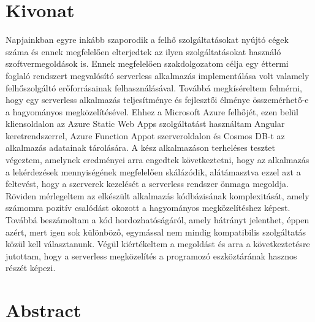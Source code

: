 \chapter*{Kivonat}

Napjainkban egyre inkább szaporodik a felhő szolgáltatásokat nyújtó cégek száma és ennek megfelelően elterjedtek az ilyen szolgáltatásokat használó szoftvermegoldások is. Ennek megfelelően szakdolgozatom célja egy éttermi foglaló rendszert megvalósító serverless alkalmazás implementálása volt valamely felhőszolgáltó erőforrásainak felhasználásával. Továbbá megkíséreltem felmérni, hogy egy serverless alkalmazás teljesítménye és fejlesztői élménye összemérhető-e a hagyományos megközelítésével. Ehhez a Microsoft Azure felhőjét, ezen belül kliensoldalon az Azure Static Web Apps szolgáltatást használtam Angular keretrendszerrel, Azure Function Appot szerveroldalon és Cosmos DB-t az alkalmazás adatainak tárolására. A kész alkalmazáson terheléses tesztet végeztem, amelynek eredményei arra engedtek következtetni, hogy az alkalmazás a lekérdezések mennyiségének megfelelően skálázódik, alátámasztva ezzel azt a feltevést, hogy a szerverek kezelését a serverless rendszer önmaga megoldja. Röviden mérlegeltem az elkészült alkalmazás kódbázisának komplexitását, amely számomra pozitív csalódást okozott a hagyományos megközelítéshez képest. Továbbá beszámoltam a kód hordozhatóságáról, amely hátrányt jelenthet, éppen azért, mert igen sok különböző, egymással nem mindig kompatibilis szolgáltatás közül kell választanunk. 
Végül kiértékeltem a megoldást és arra a következtetésre jutottam, hogy a serverless megközelítés a programozó eszköztárának hasznos részét képezi. 
\vfill

\chapter*{Abstract}

